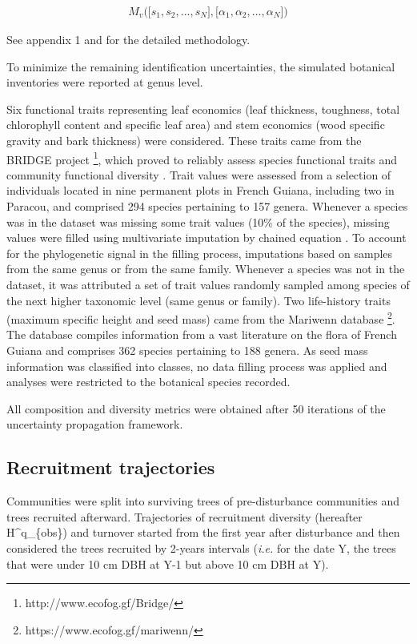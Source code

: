 \documentclass[fleqn,10pt]{ArtEcoFoG} %
\begin{document}
\begin{align}
M_v\Big(\big[s_1, s_2,..., s_N\big],\big[\alpha_1, \alpha_2,..., \alpha_N\big]\Big) \nonumber
\end{align}

See appendix 1 and \citet{Aubry-Kientz2013} for the detailed
methodology.

To minimize the remaining identification uncertainties, the simulated
botanical inventories were reported at genus level.

Six functional traits representing leaf economics (leaf thickness,
toughness, total chlorophyll content and specific leaf area) and stem
economics (wood specific gravity and bark thickness) were considered.
These traits came from the BRIDGE project \footnote{http://www.ecofog.gf/Bridge/},
which proved to reliably assess species functional traits and community
functional diversity \citep{Paine2015}. Trait values were assessed from
a selection of individuals located in nine permanent plots in French
Guiana, including two in Paracou, and comprised 294 species pertaining
to 157 genera. Whenever a species was in the dataset was missing some
trait values (10\% of the species), missing values were filled using
multivariate imputation by chained equation \citep{Mice2011}. To account
for the phylogenetic signal in the filling process, imputations based on
samples from the same genus or from the same family. Whenever a species
was not in the dataset, it was attributed a set of trait values randomly
sampled among species of the next higher taxonomic level (same genus or
family). Two life-history traits (maximum specific height and seed mass)
came from the Mariwenn database \footnote{https://www.ecofog.gf/mariwenn/}.
The database compiles information from a vast literature on the flora of
French Guiana \citep{Ollivier2007} and comprises 362 species pertaining
to 188 genera. As seed mass information was classified into classes, no
data filling process was applied and analyses were restricted to the
botanical species recorded.

All composition and diversity metrics were obtained after 50 iterations
of the uncertainty propagation framework.

\subsection{Recruitment trajectories}\label{recruitment-trajectories}

Communities were split into surviving trees of pre-disturbance
communities and trees recruited afterward. Trajectories of recruitment
diversity (hereafter H\^{}q\_\{obs\}) and turnover started from the
first year after disturbance and then considered the trees recruited by
2-years intervals (\emph{i.e.} for the date Y, the trees that were under
10 cm DBH at Y-1 but above 10 cm DBH at Y).
\end{document}
